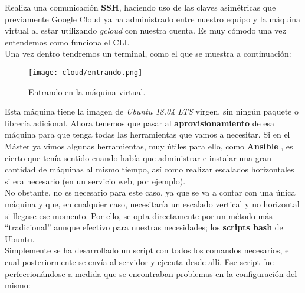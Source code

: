 \documentclass[11pt,fleqn]{book} %
\begin{document}
Realiza una comunicación \textbf{SSH}, haciendo uso de las claves asimétricas que previamente Google Cloud ya ha administrado entre nuestro equipo y la máquina virtual al estar utilizando \textit{gcloud} con nuestra cuenta. Es muy cómodo una vez entendemos como funciona el CLI. \\

Una vez dentro tendremos un terminal, como el que se muestra a continuación: 

\begin{figure}[H]
	\centering\texttt{[image: cloud/entrando.png]}
	\caption{Entrando en la máquina virtual.}
	\label{fig:cloudentrando} %
\end{figure} 

Esta máquina tiene la imagen de \textit{Ubuntu 18.04 LTS} virgen, sin ningún paquete o librería adicional. Ahora tenemos que pasar al \textbf{aprovisionamiento} de esa máquina para que tenga todas las herramientas que vamos a necesitar. Si en el Máster ya vimos algunas herramientas, muy útiles para ello, como \textbf{Ansible} \cite{article:ansible}, es cierto que tenía sentido cuando había que administrar e instalar una gran cantidad de máquinas al mismo tiempo, así como realizar escalados horizontales si era necesario (en un servicio web, por ejemplo). \\

No obstante, no es necesario para este caso, ya que se va a contar con una única máquina y que, en cualquier caso, necesitaría un escalado vertical y no horizontal si llegase ese momento. Por ello, se opta directamente por un método más ``tradicional'' aunque efectivo para nuestras necesidades; los \textbf{scripts bash} de Ubuntu. \\

Simplemente se ha desarrollado un script con todos los comandos necesarios, el cual posteriormente se envía al servidor y ejecuta desde allí. Ese script fue perfeccionándose a medida que se encontraban problemas en la configuración del mismo: \\
\end{document}

